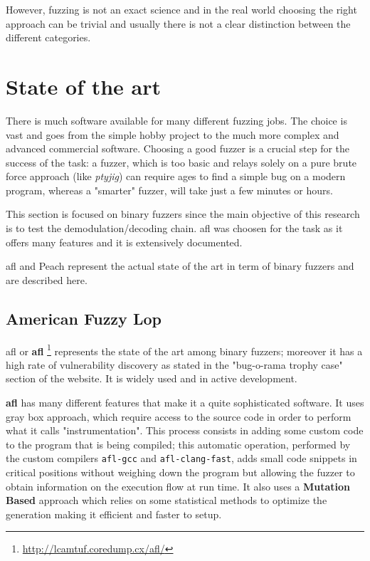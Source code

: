 \documentclass[../main.tex]{subfiles}
\begin{document}
However, fuzzing is not an exact science and in the real world choosing the right approach can be trivial and usually there is not a clear distinction between the different categories.


\section{State of the art}

There is much software available for many different fuzzing jobs. The choice is vast and goes from the simple hobby project to the much more complex and advanced commercial software. Choosing a good fuzzer is a crucial step for the success of the task: a fuzzer, which is too basic and relays solely on a pure brute force approach (like \textit{ptyjig}) can require ages to find a simple bug on a modern program, whereas a "smarter" fuzzer, will take just a few minutes or hours.

This section is focused on binary fuzzers since the main objective of this research is to test the demodulation/decoding chain. \acrlong{afl} was choosen for the task as it offers many features and it is extensively documented.

\acrlong{afl} and Peach represent the actual state of the art in term of binary fuzzers and are described here.

\subsection{American Fuzzy Lop}

\acrlong{afl} or \textbf{\acrshort{afl}} \footnote{\url{http://lcamtuf.coredump.cx/afl/}} represents the state of the art among binary fuzzers; moreover it has a high rate of vulnerability discovery as stated in the "bug-o-rama trophy case" section of the website. It is widely used and in active development.

\textbf{\acrshort{afl}} has many different features that make it a quite sophisticated software. It uses gray box approach, which require access to the source code in order to perform what it calls "instrumentation". This process consists in adding some custom code to the program that is being compiled; this automatic operation, performed by the custom compilers \texttt{afl-gcc} and \texttt{afl-clang-fast}, adds small code snippets in critical positions without weighing down the program but allowing the fuzzer to obtain information on the execution flow at run time. It also uses a \textbf{Mutation Based} approach which relies on  some statistical methods to optimize the generation making it efficient and faster to setup.
\end{document}
